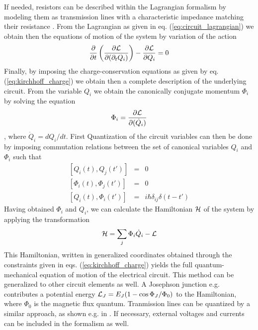 %
If needed, resistors can be described within the Lagrangian formalism by modeling them as transmission lines with a characteristic impedance matching their resistance \citep{yurke_quantum_1984}. From the Lagrangian as given in eq. (\ref{eq:circuit_lagrangian}) we obtain then the equations of motion of the system by variation of the action
%
\begin{equation}
\frac{\partial}{\partial t}\left( \frac{\partial \begin{mathcal}L\end{mathcal}}{\partial(\partial_t Q_i)}\right)-\frac{\partial \begin{mathcal}L\end{mathcal}}{\partial Q_i} = 0
\end{equation}
%
Finally, by imposing the charge-conservation equations as given by eq. (\ref{eq:kirchhoff_charge}) we obtain then a complete description of the underlying circuit. From the variable $Q_i$ we obtain the canonically conjugate momentum $\Phi_i$ by solving the equation
%
\begin{equation}
\Phi_i = \frac{\partial \begin{mathcal}L\end{mathcal}}{\partial(\dot{Q}_i)}
\end{equation}
%
, where $\dot{Q}_i=dQ_i/dt$. First Quantization of the circuit variables can then be done by imposing commutation relations between the set of canonical variables $Q_i$ and $\Phi_i$ such that
%
\begin{eqnarray}
\left[Q_i(t),Q_j(t')\right] & = & 0 \\
\left[\Phi_i(t),\Phi_j(t') \right] & = & 0 \\
\left[Q_i(t),\Phi_i(t')\right] & = & i\hbar\delta_{ij}\delta(t-t') \label{eq:quantization_commutation_relations}
\end{eqnarray}
%
Having obtained $\Phi_i$ and $Q_i$, we can calculate the Hamiltonian $\begin{mathcal}H\end{mathcal}$ of the system by applying the transformation
%
\begin{equation}
\begin{mathcal}H\end{mathcal} = \sum\limits_j \Phi_i \dot{Q}_i - \begin{mathcal}L\end{mathcal}
\end{equation}
%
This Hamiltonian, written in generalized coordinates obtained through the constraints given in eqs. (\ref{eq:kirchhoff_charge}) yields the full quantum-mechanical equation of motion of the electrical circuit. This method can be generalized to other circuit elements as well. A Josephson junction e.g. contributes a potential energy $\begin{mathcal}L_J\end{mathcal}=E_J(1-\cos{\Phi_J/\Phi_0})$ to the Hamiltonian, where $\Phi_0$ is the magnetic flux quantum. Tranmission lines can be quantized by a similar approach, as shown e.g. in \citep{yurke_quantum_1984}. If necessary, external voltages and currents can be included in the formalism as well.

